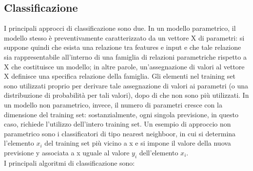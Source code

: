 \subsection{Classificazione}
I principali approcci di classificazione sono due. In un modello parametrico, il modello stesso è preventivamente caratterizzato da un vettore X di parametri: si suppone quindi che esista una relazione tra features e input e che tale relazione sia rappresentabile all’interno di una famiglia di
relazioni parametriche rispetto a X che costituisce un modello; in altre parole,
un'assegnazione di valori al vettore X definisce una specifica relazione della
famiglia. Gli elementi nel training set sono utilizzati proprio per derivare tale
assegnazione di valori ai parametri (o una distribuzione di probabilità per tali
valori), dopo di che non sono più utilizzati.
In un modello non parametrico, invece, il numero di parametri cresce con la
dimensione del training set: sostanzialmente, ogni singola previsione, in questo
caso, richiede l’utilizzo dell’intero training set. Un esempio di approccio non
parametrico sono i classificatori di tipo nearest neighboor, in cui si determina
l'elemento $x_i$ del training set più vicino a x e si impone il valore della nuova
previsione y associata a x uguale al valore $y_i$ dell’elemento $x_i$.\\
I principali algoritmi di classificazione sono:
